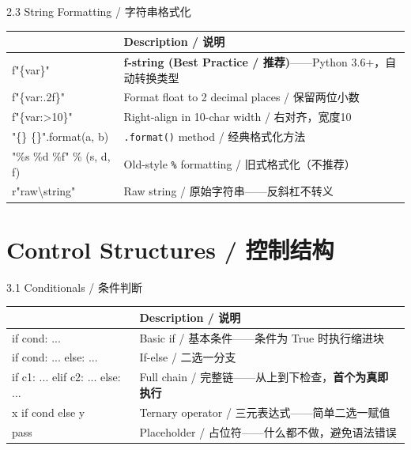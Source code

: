\documentclass[11pt,a4paper]{report}
\let\oldtexttt\texttt
\renewcommand{\texttt}[1]{\textcolor{mainblue}{\oldtexttt{#1}}}
\begin{document}
\begin{cmdsection}{2.3  String Formatting / 字符串格式化}
\normalsize\renewcommand{\arraystretch}{1.4}
\centering
\begin{tabularx}{\textwidth}{@{}>{\ttfamily}l>{\raggedright\arraybackslash}X@{}}
\toprule
\multicolumn{1}{@{}l}{\textbf{Syntax}} & \textbf{Description / 说明} \\ \midrule
f"\{var\}"              & \textbf{f-string (Best Practice / 推荐)}——Python 3.6+，自动转换类型 \\
f"\{var:.2f\}"           & Format float to 2 decimal places / 保留两位小数 \\
f"\{var:>10\}"           & Right-align in 10-char width / 右对齐，宽度10 \\
"\{\} \{\}".format(a, b)  & \texttt{.format()} method / 经典格式化方法 \\
"\%s \%d \%f" \% (s, d, f) & Old-style \texttt{\%} formatting / 旧式格式化（不推荐） \\
r"raw\textbackslash string"      & Raw string / 原始字符串——反斜杠不转义 \\
\bottomrule
\end{tabularx}
\end{cmdsection}

\newpage

\chapter{Control Structures / 控制结构}

\begin{cmdsection}{3.1  Conditionals / 条件判断}
\normalsize\renewcommand{\arraystretch}{1.4}
\centering
\begin{tabularx}{\textwidth}{@{}>{\ttfamily}l>{\raggedright\arraybackslash}X@{}}
\toprule
\multicolumn{1}{@{}l}{\textbf{Syntax}} & \textbf{Description / 说明} \\ \midrule
if cond: ...             & Basic if / 基本条件——条件为 True 时执行缩进块 \\
if cond: ... else: ...   & If-else / 二选一分支 \\
if c1: ... elif c2: ... else: ... & Full chain / 完整链——从上到下检查，\textbf{首个为真即执行} \\
x if cond else y         & Ternary operator / 三元表达式——简单二选一赋值 \\
pass                     & Placeholder / 占位符——什么都不做，避免语法错误 \\
\bottomrule
\end{tabularx}
\end{cmdsection}
\end{document}
